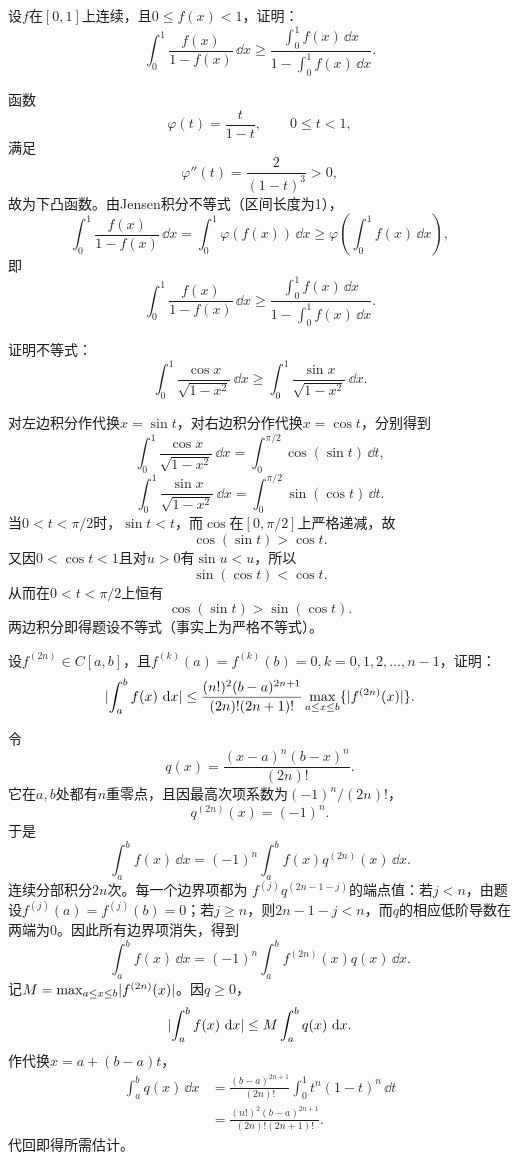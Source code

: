 \begin{xreferenceproblem}[4]
设$f$在$[0,1]$上连续，且$0\le f(x)<1$，证明：
  \[
    \int_0^1\frac{f(x)}{1-f(x)}\,\dd x
    \ge\frac{\int_0^1f(x)\,\dd x}{1-\int_0^1f(x)\,\dd x}.
  \]
\end{xreferenceproblem}
\begin{xsolution}
函数
\[
 \varphi(t)=\frac{t}{1-t},\qquad 0\le t<1,
\]
满足
\[
 \varphi''(t)=\frac{2}{(1-t)^3}>0,
\]
故为下凸函数。由Jensen积分不等式（区间长度为1），
\[
 \int_0^1\frac{f(x)}{1-f(x)}\,\dd x
 =\int_0^1\varphi(f(x))\,\dd x
 \ge\varphi\left(\int_0^1f(x)\,\dd x\right),
\]
即
\[
 \int_0^1\frac{f(x)}{1-f(x)}\,\dd x
 \ge\frac{\int_0^1f(x)\,\dd x}{1-\int_0^1f(x)\,\dd x}.
\]
\end{xsolution}


\begin{xreferenceproblem}[5]
证明不等式：
  \[
    \int_0^1\frac{\cos x}{\sqrt{1-x^2}}\,\dd x
    \ge\int_0^1\frac{\sin x}{\sqrt{1-x^2}}\,\dd x.
  \]
\end{xreferenceproblem}
\begin{xsolution}
对左边积分作代换$x=\sin t$，对右边积分作代换$x=\cos t$，分别得到
\[
 \int_0^1\frac{\cos x}{\sqrt{1-x^2}}\,\dd x
 =\int_0^{\pi/2}\cos(\sin t)\,\dd t,
\]
\[
 \int_0^1\frac{\sin x}{\sqrt{1-x^2}}\,\dd x
 =\int_0^{\pi/2}\sin(\cos t)\,\dd t.
\]
当$0<t<\pi/2$时，$\sin t<t$，而$\cos$在$[0,\pi/2]$上严格递减，故
\[
 \cos(\sin t)>\cos t.
\]
又因$0<\cos t<1$且对$u>0$有$\sin u<u$，所以
\[
 \sin(\cos t)<\cos t.
\]
从而在$0<t<\pi/2$上恒有
\[
 \cos(\sin t)>\sin(\cos t).
\]
两边积分即得题设不等式（事实上为严格不等式）。
\end{xsolution}


\begin{xreferenceproblem}[6]
设$f^{(2n)}\in C[a,b]$，且$f^{(k)}(a)=f^{(k)}(b)=0,k=0,1,2,\ldots,n-1$，证明：
  \[
    \lvert\int_a^bf(x)\,\mathop{}\!\mathrm{d} x\rvert
    \le\frac{(n!)^2(b-a)^{2n+1}}{(2n)!(2n+1)!}
    \max_{a\le x\le b}\{\lvert f^{(2n)}(x)\rvert\}.
  \]
\end{xreferenceproblem}
\begin{xsolution}
令
\[
 q(x)=\frac{(x-a)^n(b-x)^n}{(2n)!}.
\]
它在$a,b$处都有$n$重零点，且因最高次项系数为$(-1)^n/(2n)!$，
\[
 q^{(2n)}(x)=(-1)^n.
\]
于是
\[
 \int_a^bf(x)\,\dd x
 =(-1)^n\int_a^bf(x)q^{(2n)}(x)\,\dd x.
\]
连续分部积分$2n$次。每一个边界项都为
$f^{(j)}q^{(2n-1-j)}$的端点值：若$j<n$，由题设$f^{(j)}(a)=f^{(j)}(b)=0$；若$j\ge n$，则$2n-1-j<n$，而$q$的相应低阶导数在两端为0。因此所有边界项消失，得到
\[
 \int_a^bf(x)\,\dd x
 =(-1)^n\int_a^bf^{(2n)}(x)q(x)\,\dd x.
\]
记$M=\max_{a\le x\le b}\lvert f^{(2n)}(x)\rvert$。因$q\ge0$，
\[
 \lvert\int_a^bf(x)\,\mathop{}\!\mathrm{d} x\rvert
 \le M\int_a^bq(x)\,\mathop{}\!\mathrm{d} x.
\]
作代换$x=a+(b-a)t$，
\begin{align*}
\int_a^bq(x)\,\dd x
&=\frac{(b-a)^{2n+1}}{(2n)!}
 \int_0^1t^n(1-t)^n\,\dd t\\
&=\frac{(n!)^2(b-a)^{2n+1}}{(2n)!(2n+1)!}.
\end{align*}
代回即得所需估计。
\end{xsolution}


